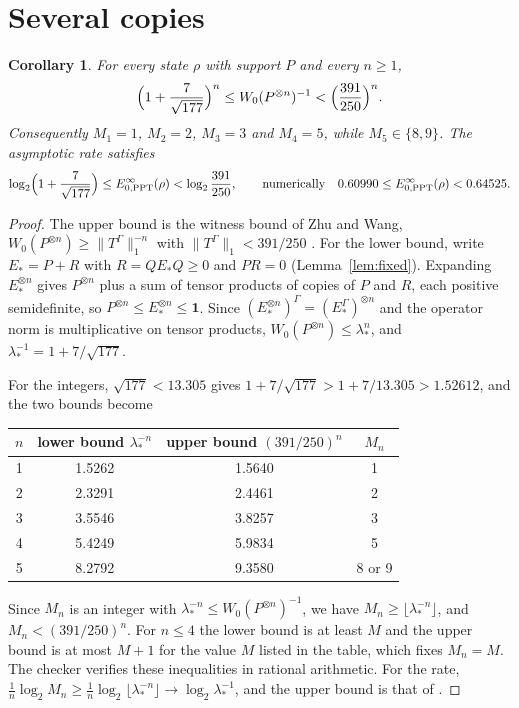 \documentclass[11pt,a4paper]{article}
\newtheorem{corollary}[theorem]{Corollary}
\theoremstyle{definition}
\theoremstyle{plain}
\newcommand{\norm}[1]{\lVert#1\rVert}
\newcommand{\one}{\mathbf{1}}
\begin{document}
\section{Several copies}\label{sec:copies}
\begin{corollary}\label{cor:copies}
For every state $\rho$ with support $P$ and every $n\ge1$,
\[
\Bigl(1+\frac7{\sqrt{177}}\Bigr)^{n}\le W_0(P^{\otimes n})^{-1}
<\Bigl(\frac{391}{250}\Bigr)^{n}.
\]
Consequently $M_1=1$, $M_2=2$, $M_3=3$ and $M_4=5$, while $M_5\in\{8,9\}$.
The asymptotic rate satisfies
\[
\log_2\Bigl(1+\frac7{\sqrt{177}}\Bigr)\le E^\infty_{0,\mathrm{PPT}}(\rho)
<\log_2\frac{391}{250},
\qquad\text{numerically}\quad0.60990\le E^\infty_{0,\mathrm{PPT}}(\rho)<0.64525 .
\]
\end{corollary}
\begin{proof}
The upper bound is the witness bound of Zhu and Wang,
$W_0(P^{\otimes n})\ge\norm{T^\Gamma}_1^{-n}$ with
$\norm{T^\Gamma}_1<391/250$ \cite[Theorem~2.2 and Eq.~(3.9)]{ZhuWang2026}.
For the lower bound, write $E_*=P+R$ with $R=QE_*Q\ge0$ and $PR=0$
(Lemma~\ref{lem:fixed}). Expanding $E_*^{\otimes n}$ gives $P^{\otimes n}$ plus
a sum of tensor products of copies of $P$ and $R$, each positive
semidefinite, so $P^{\otimes n}\le E_*^{\otimes n}\le\one$. Since
$(E_*^{\otimes n})^\Gamma=(E_*^\Gamma)^{\otimes n}$ and the operator norm is
multiplicative on tensor products,
$W_0(P^{\otimes n})\le\lambda_*^n$, and $\lambda_*^{-1}=1+7/\sqrt{177}$.

For the integers, $\sqrt{177}<13.305$ gives
$1+7/\sqrt{177}>1+7/13.305>1.52612$, and the two bounds become
\begin{center}
\begin{tabular}{@{}cccc@{}}
\toprule
$n$ & lower bound $\lambda_*^{-n}$ & upper bound $(391/250)^n$ & $M_n$\\
\midrule
1 & 1.5262 & 1.5640 & 1\\
2 & 2.3291 & 2.4461 & 2\\
3 & 3.5546 & 3.8257 & 3\\
4 & 5.4249 & 5.9834 & 5\\
5 & 8.2792 & 9.3580 & 8 or 9\\
\bottomrule
\end{tabular}
\end{center}
Since $M_n$ is an integer with $\lambda_*^{-n}\le W_0(P^{\otimes n})^{-1}$,
we have $M_n\ge\lfloor\lambda_*^{-n}\rfloor$, and $M_n<(391/250)^n$. For
$n\le4$ the lower bound is at least $M$ and the upper bound is at most $M+1$
for the value $M$ listed in the table, which fixes $M_n=M$. The checker
verifies these inequalities in rational arithmetic. For the rate,
$\frac1n\log_2M_n\ge\frac1n\log_2\lfloor\lambda_*^{-n}\rfloor\to
\log_2\lambda_*^{-1}$, and the upper bound is that of \cite{ZhuWang2026}.
\end{proof}
\end{document}

